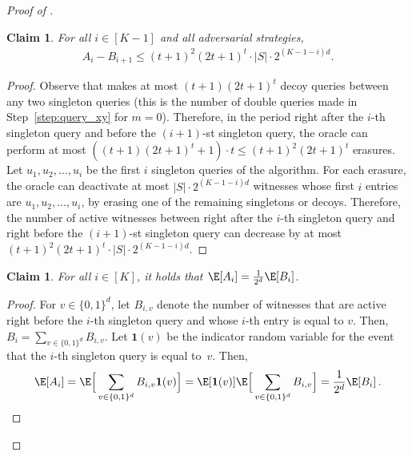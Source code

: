 \documentclass[11pt]{article}
\numberwithin{equation}{section}
\newtheorem{claim}[theorem]{Claim}
\theoremstyle{definition}
\theoremstyle{plain}
\begin{document}
\begin{proof}[Proof of ]
\begin{claim} \label{clm:difference}
For all $i \in [K-1]$ and all adversarial strategies, 
\begin{align*}
    A_i - B_{i+1} \leq (t+1)^2(2t+1)^t \cdot |S| \cdot 2^{(K-1-i)d}.
\end{align*}
\end{claim}
\begin{proof}
Observe that  makes at most $(t+1)(2t+1)^t$ decoy queries between any two singleton queries (this is the number of double queries made in Step~\ref{step:query_xy} for $m=0$).  Therefore, in the period right after the $i$-th singleton query and before the $(i+1)$-st singleton query, the oracle can perform at most $((t+1)(2t+1)^t+1)\cdot t \leq (t+1)^2(2t+1)^t$ erasures. Let $u_1, u_2, \dots, u_i$ be the first $i$ singleton queries of the algorithm. For each erasure, the oracle can deactivate at most $|S|\cdot 2^{(K-1-i)d}$ witnesses whose first $i$ entries are $u_1, u_2, \dots, u_i$, by erasing one of the remaining singletons or decoys. Therefore, the number of active witnesses between right after the $i$-th singleton query and right before the $(i+1)$-st singleton query can decrease by at most $(t+1)^2(2t+1)^t \cdot |S| \cdot 2^{(K-1-i)d}$. 
\end{proof}


\begin{claim} For all $i\in [K]$, it holds that $\E[A_i] = \frac{1}{2^d}\E[B_i]$. 
\label{clm:expectation}
\end{claim}
\begin{proof} For $v \in \{0,1\}^d$, let $B_{i,v}$ denote the number of  witnesses that are active right before the $i$-th singleton query and whose $i$-th entry is equal to $v$. Then, $B_i = \sum_{v \in \{0,1\}^d} B_{i,v}$. Let $\mathbf{1}(v)$ be the indicator random variable for the event that the $i$-th singleton query is equal to~$v$. Then,  
\[
    \E[A_i] =   \E\Big[\sum_{v \in \{0,1\}^d} B_{i,v}\mathbf{1}(v)\Big]
    = \E[\mathbf{1}(v)]\E\Big[\sum_{v \in \{0,1\}^d} B_{i,v}\Big] 
    = \frac{1}{2^d}\E[B_i]\,. 
%
    \qedhere
\]
\end{proof}


\end{proof}
\end{document}
